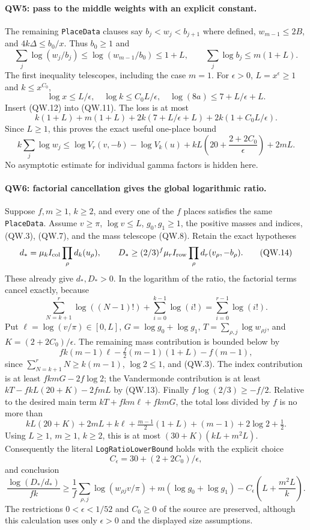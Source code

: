 \paragraph{QW5: pass to the middle weights with an explicit constant.}
The remaining \texttt{PlaceData} clauses say
$b_j<w_j<b_{j+1}$ where defined, $w_{m-1}\le2B$, and
$4k\Delta\le b_0/x$. Thus $b_0\ge1$ and
\[
 \sum_j\log(w_j/b_j)
 \le\log(w_{m-1}/b_0)\le1+L,\qquad
                     \sum_j\log b_j\le m(1+L).               \tag{QW.12}
\]
The first inequality telescopes, including the case $m=1$.
For $\epsilon>0$, $L=x^\epsilon\ge1$ and $k\le x^{C_0}$,
\[
 \log x\le L/\epsilon,\quad
 \log k\le C_0L/\epsilon,\quad
 \log(8a)\le7+L/\epsilon+L.
\]
Insert (QW.12) into (QW.11). The loss is at most
\[
 k(1+L)+m(1+L)+2k(7+L/\epsilon+L)
                 +2k(1+C_0L/\epsilon).
\]
Since $L\ge1$, this proves the exact useful one-place bound
\[
 k\sum_j\log w_j\le\log V_r(v,-b)-\log V_k(u)
       +kL\left(20+\frac{2+2C_0}{\epsilon}\right)+2mL.          \tag{QW.13}
\]
No asymptotic estimate for individual gamma factors is hidden here.

\paragraph{QW6: factorial cancellation gives the global logarithmic ratio.}
Suppose $f,m\ge1$, $k\ge2$, and every one of the $f$ places satisfies
the same \texttt{PlaceData}. Assume $v\ge\pi$, $\log v\le L$,
$g_0,g_1\ge1$, the positive masses and indices, (QW.3), (QW.7),
and the mass telescope (QW.8). Retain the exact hypotheses
\[
 d_* =\mu_k I_{\rm col}\prod_\rho d_k(u_\rho),\qquad
 D_*\ge(2/3)^f\mu_r I_{\rm row}\prod_\rho d_r(v_\rho,-b_\rho).
                                                                    \tag{QW.14}
\]
These already give $d_*,D_*>0$. In the logarithm of the ratio, the
factorial terms cancel exactly, because
\[
 \sum_{N=k+1}^r\log((N-1)!)+\sum_{i=0}^{k-1}\log(i!)
                         =\sum_{i=0}^{r-1}\log(i!).            \tag{QW.15}
\]
Put $\ell=\log(v/\pi)\in[0,L]$, $G=\log g_0+\log g_1$,
$T=\sum_{\rho,j}\log w_{\rho j}$, and $K=(2+2C_0)/\epsilon$.
The remaining mass contribution is bounded below by
\[
 fk(m-1)\ell-\tfrac f2(m-1)(1+L)-f(m-1),
\]
since $\sum_{N=k+1}^rN\ge k(m-1)$, $\log2\le1$, and (QW.3).
The index contribution is at least $fkmG-2f\log2$; the Vandermonde
contribution is at least $kT-fkL(20+K)-2fmL$ by (QW.13).
Finally $f\log(2/3)\ge-f/2$.
Relative to the desired main term $kT+fkm\ell+fkmG$, the total loss
divided by $f$ is no more than
\[
 kL(20+K)+2mL+k\ell+\tfrac{m-1}{2}(1+L)
                     +(m-1)+2\log2+\tfrac12.
\]
Using $L\ge1$, $m\ge1$, $k\ge2$, this is at most
$(30+K)(kL+m^2L)$. Consequently the literal
\texttt{LogRatioLowerBound} holds with the explicit choice
\[
 \boxed{C_\epsilon=30+(2+2C_0)/\epsilon},                       \tag{QW.16}
\]
and conclusion
\[
 \frac{\log(D_*/d_*)}{fk}\ge
 \frac1f\sum_{\rho,j}\log(w_{\rho j}v/\pi)
 +m(\log g_0+\log g_1)-C_\epsilon\left(L+\frac{m^2L}{k}\right).
                                                                    \tag{QW.17}
\]
The restrictions $0<\epsilon<1/52$ and $C_0\ge0$ of the source are
preserved, although this calculation uses only $\epsilon>0$ and the
displayed size assumptions.

